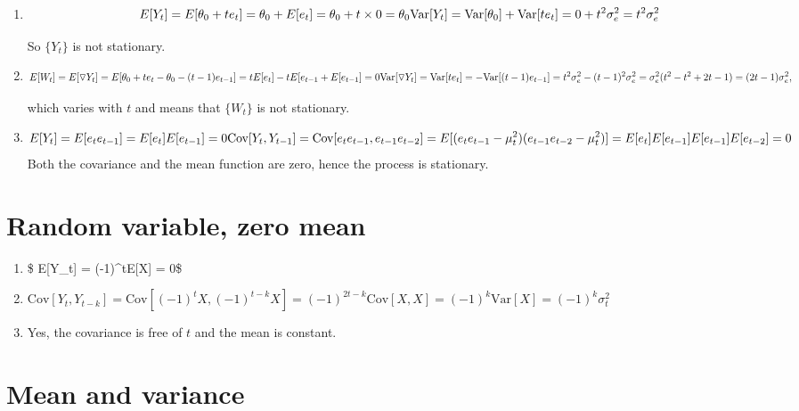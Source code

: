 \documentclass[]{book}
\providecommand{\tightlist}{%
  \setlength{\itemsep}{0pt}\setlength{\parskip}{0pt}}
\begin{document}
\begin{enumerate}
\def\labelenumi{(\alph{enumi})}
\item
  \[
    E[Y_t]= E[\theta_0 +  t e_t] = \theta_0 + E[e_t] = \theta_0+t \times 0 = \theta_0\\
  \text{Var}[Y_t] = \text{Var}[\theta_0] + \text{Var}[t e_t] = 0 + t^2\sigma_e^2 = t^2\sigma_e^2
  \]

  So \(\{Y_t\}\) is not stationary.
\item
  \[
    E[W_t] = E[\triangledown Y_t] = E[\theta_0 + te_t - \theta_0 - (t-1)e_{t-1}] =
      tE[e_t] - tE[e_{t-1} + E[e_{t-1}] = 0 \\
    \text{Var}[\triangledown Y_t] = \text{Var}[t e_t] = - \text{Var}[(t-1)e_{t-1}] = 
      t^2 \sigma_e^2 - (t-1)^2 \sigma_e^2 = \sigma_e^2 (t^2 - t^2 + 2t - 1) = (2t-1)\sigma_e^2,
  \]

  which varies with \(t\) and means that \(\{W_t\}\) is not stationary.
\item
  \[
    E[Y_t] = E[e_t e_{t-1}] = E[e_t] E[e_{t-1}] = 0\\
    \text{Cov}[Y_t, Y_{t-1}] = \text{Cov}[e_t e_{t-1}, e_{t-1} e_{t-2}] = E[(e_t e_{t-1} - \mu_t^2)(e_{t-1} e_{t-2} - \mu_t^2)] =\\
    E[e_t]E[e_{t-1}]E[e_{t-1}]E[e_{t-2}] = 0
  \] Both the covariance and the mean function are zero, hence the
  process is stationary.
\end{enumerate}

\section{Random variable, zero mean}\label{random-variable-zero-mean}

\begin{enumerate}
\def\labelenumi{(\alph{enumi})}
\tightlist
\item
  \$ E{[}Y\_t{]} = (-1)\^{}tE{[}X{]} = 0\$
\item
  \(\text{Cov}[Y_t, Y_{t-k}] = \text{Cov}[(-1)^tX, (-1)^{t-k}X] = (-1)^{2t-k}\text{Cov}[X, X] = (-1)^k \text{Var}[X] = (-1)^k\sigma_t^2\)
\item
  Yes, the covariance is free of \(t\) and the mean is constant.
\end{enumerate}

\section{Mean and variance}\label{mean-and-variance}
\end{document}

